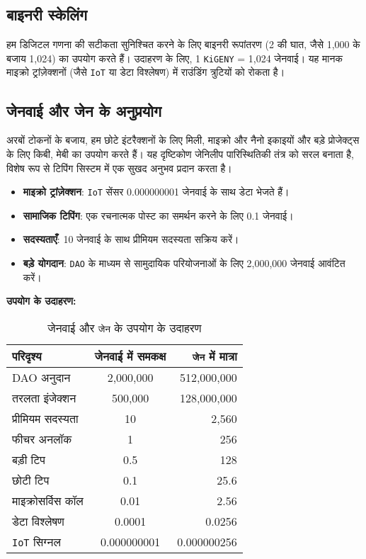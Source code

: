 \documentclass[a4paper,12pt,openany]{book}
\begin{document}
\subsection*{बाइनरी स्केलिंग}
हम डिजिटल गणना की सटीकता सुनिश्चित करने के लिए बाइनरी रूपांतरण (2 की घात, जैसे 1,000 के बजाय 1,024) का उपयोग करते हैं। उदाहरण के लिए, 1 \texttt{KiGENY} = 1,024 जेनवाई। यह मानक माइक्रो ट्रांज़ेक्शनों (जैसे \texttt{IoT} या डेटा विश्लेषण) में राउंडिंग त्रुटियों को रोकता है।

\subsection*{जेनवाई और जेन के अनुप्रयोग}
अरबों टोकनों के बजाय, हम छोटे इंटरैक्शनों के लिए मिली, माइक्रो और नैनो इकाइयों और बड़े प्रोजेक्ट्स के लिए किबी, मेबी का उपयोग करते हैं। यह दृष्टिकोण जेनिलीप पारिस्थितिकी तंत्र को सरल बनाता है, विशेष रूप से टिपिंग सिस्टम में एक सुखद अनुभव प्रदान करता है।
\begin{itemize}
    \item \textbf{माइक्रो ट्रांज़ेक्शन}: \texttt{IoT} सेंसर 0.000000001 जेनवाई के साथ डेटा भेजते हैं।
    \item \textbf{सामाजिक टिपिंग}: एक रचनात्मक पोस्ट का समर्थन करने के लिए 0.1 जेनवाई।
    \item \textbf{सदस्यताएँ}: 10 जेनवाई के साथ प्रीमियम सदस्यता सक्रिय करें।
    \item \textbf{बड़े योगदान}: \texttt{DAO} के माध्यम से सामुदायिक परियोजनाओं के लिए 2,000,000 जेनवाई आवंटित करें।
\end{itemize}

\textbf{उपयोग के उदाहरण:}
\begin{table}[h]
\centering
\caption{जेनवाई और \texttt{जेन} के उपयोग के उदाहरण}
\small
\begin{tabular}{l c r}
\hline
\textbf{परिदृश्य} & \textbf{जेनवाई में समकक्ष} & \textbf{\texttt{जेन} में मात्रा} \\
\hline
DAO अनुदान & 2,000,000 & 512,000,000 \\
तरलता इंजेक्शन & 500,000 & 128,000,000 \\
प्रीमियम सदस्यता & 10 & 2,560 \\
फीचर अनलॉक & 1 & 256 \\
बड़ी टिप & 0.5 & 128 \\
छोटी टिप & 0.1 & 25.6 \\
माइक्रोसर्विस कॉल & 0.01 & 2.56 \\
डेटा विश्लेषण & 0.0001 & 0.0256 \\
\texttt{IoT} सिग्नल & 0.000000001 & 0.000000256 \\
\hline
\end{tabular}
\end{table}
\end{document}
